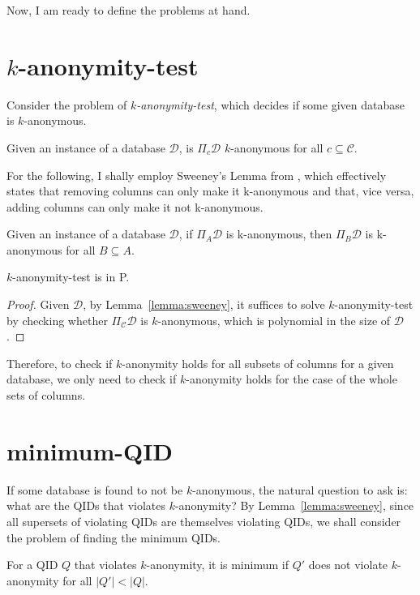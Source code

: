 \documentclass[12pt]{llncs}
\newcommand{\cC}{\mathcal{C}}
\newcommand{\cD}{\mathcal{D}}
\newcommand{\Proj}[1]{\Pi_{#1}}
\begin{document}
Now, I am ready to define the problems at hand.

\section{$k$-anonymity-test}
Consider the problem of \emph{$k$-anonymity-test}, which decides if some given database is $k$-anonymous.

\begin{problem}
Given an instance of a database $\cD$, is $\Proj{c} \cD$ $k$-anonymous for all $c \subseteq \cC$.
\end{problem}

For the following, I shally employ Sweeney's Lemma from \cite{Sweeney:2002}, which effectively states that removing columns can only make it k-anonymous and that, vice versa, adding columns can only make it not k-anonymous.

\begin{lemma}
Given an instance of a database $\cD$, if $\Proj{A} \cD$ is k-anonymous, then $\Proj{B} \cD$ is k-anonymous for all $B \subseteq A$.
\label{lemma:sweeney}
\end{lemma}

\begin{proposition}
$k$-anonymity-test is in P.
\end{proposition}

\begin{proof}
Given $\cD$, by Lemma~\ref{lemma:sweeney}, it suffices to solve $k$-anonymity-test by checking whether $\Proj{\cC} \cD$ is $k$-anonymous, which is polynomial in the size of $\cD$.
\end{proof}

Therefore, to check if $k$-anonymity holds for all subsets of columns for a given database, we only need to check if $k$-anonymity holds for the case of the whole sets of columns.

\section{minimum-QID}
If some database is found to not be $k$-anonymous, the natural question to ask is: what are the QIDs that violates $k$-anonymity? By Lemma~\ref{lemma:sweeney}, since all supersets of violating QIDs are themselves violating QIDs, we shall consider the problem of finding the minimum QIDs.

\begin{definition}
For a QID $Q$ that violates $k$-anonymity, it is minimum if $Q'$ does not violate $k$-anonymity for all $|Q'| < |Q|$.
\end{definition}
\end{document}
